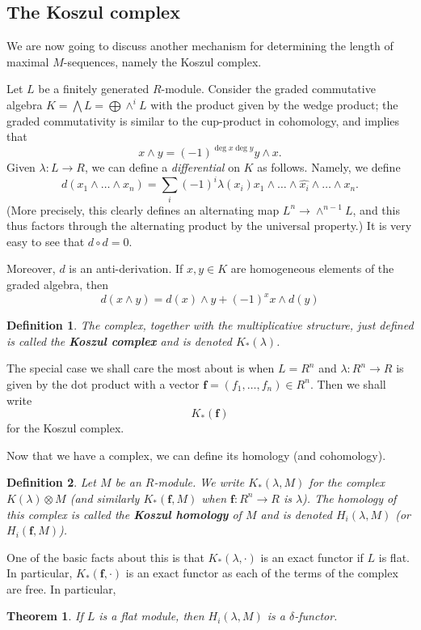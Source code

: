 \documentclass{article}
\newtheorem{theorem}{Theorem}
\newtheorem{definition}{Definition}
\begin{document}
\subsection{The Koszul complex} 
We are now going to 
discuss another mechanism for determining the length of maximal $M$-sequences,
namely the Koszul complex.

Let $L$ be  a finitely generated $R$-module. Consider the graded commutative
algebra $K = \bigwedge L = \bigoplus \wedge^i L$ with the product given by the
wedge product; the graded commutativity is
similar to the cup-product in cohomology, and implies that
\[ x \wedge y = (-1)^{\deg x \deg y} y \wedge x.  \]
Given $\lambda: L \to R$, we can 
define a \emph{differential} on $K$ as follows. Namely, we define
\[ d( x_1 \wedge \dots \wedge x_n) = \sum_i (-1)^i\lambda(x_i) x_1 \wedge
\dots \wedge \hat{x_i} \wedge \dots \wedge x_n. \]
(More precisely, this clearly defines an alternating map $L^n \to \wedge^{n-1}
L$, and this thus factors through the alternating product by the universal
property.) It is very easy to see that $d \circ d = 0$.

Moreover, $d$ is an anti-derivation. If $x,y \in K$ are homogeneous elements
of the graded algebra, then
\[ d(x\wedge y) = d(x)\wedge  y + (-1)^x x \wedge d(y)  \]

\begin{definition} 
The complex, together with the multiplicative structure, just defined is called the \textbf{Koszul complex} and is denoted
$K_*(\lambda)$.
\end{definition} 

The special case we shall care the most about is when $L = R^n$ and 
$\lambda: R^n \to R$ is given by the dot product with a vector $\mathbf{f}=(f_1, \dots,
f_n) \in R^n$. Then we shall write
\[ K_*(\mathbf{f})  \]
for the Koszul complex.

Now that we have a complex, we can define its homology (and cohomology).
\begin{definition} 
Let $M$ be an $R$-module. We write $K_*(\lambda, M)$ for the complex $K(\lambda)
\otimes M$ (and similarly $K_*(\mathbf{f}, M)$ when $\mathbf{f}: R^n \to R$ is
$\lambda$). The homology of this complex is called the \textbf{Koszul homology}
of $M$ and is denoted $H_i(\lambda, M)$ (or $H_i(\mathbf{f}, M)$).
\end{definition} 


One of the basic facts about this is that $K_*(\lambda, \cdot)$ is an exact
functor if $L$ is flat. In particular, $K_*(\mathbf{f}, \cdot)$ is an exact
functor as each of the terms of the complex are free.
In particular,
\begin{theorem} 
If $L$ is a flat module, then $H_i(\lambda, M)$ is a $\delta$-functor.
\end{theorem} 
\end{document}
